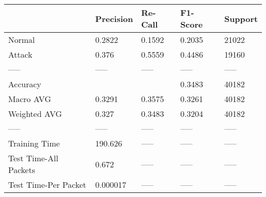 \begin{tabular}{lllll}
\toprule
{} & Precision & Re-Call & F1-Score & Support \\
\midrule
Normal                &    0.2822 &  0.1592 &   0.2035 &   21022 \\
Attack                &     0.376 &  0.5559 &   0.4486 &   19160 \\
-----                 &     ----- &   ----- &    ----- &   ----- \\
Accuracy              &           &         &   0.3483 &   40182 \\
Macro AVG             &    0.3291 &  0.3575 &   0.3261 &   40182 \\
Weighted AVG          &     0.327 &  0.3483 &   0.3204 &   40182 \\
-----                 &     ----- &   ----- &    ----- &   ----- \\
Training Time         &   190.626 &   ----- &    ----- &   ----- \\
Test Time-All Packets &     0.672 &   ----- &    ----- &   ----- \\
Test Time-Per Packet  &  0.000017 &   ----- &    ----- &   ----- \\
\bottomrule
\end{tabular}
